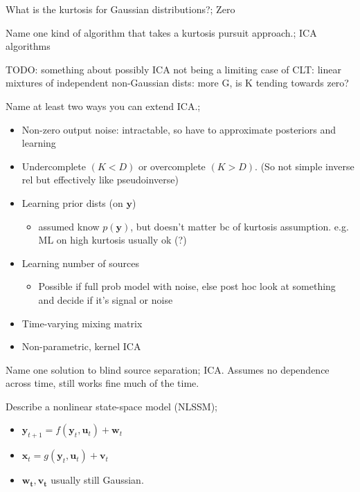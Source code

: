 \documentclass{article}
\begin{document}
What is the kurtosis for Gaussian distributions?; Zero

Name one kind of algorithm that takes a kurtosis pursuit approach.; ICA algorithms

TODO: something about possibly ICA not being a limiting case of CLT: linear mixtures of independent non-Gaussian dists: more G, is K tending towards zero?

Name at least two ways you can extend ICA.; \begin{itemize} \item Non-zero output noise: intractable, so have to approximate posteriors and learning \item Undercomplete $(K<D)$ or overcomplete $(K>D)$. (So not simple inverse rel but effectively like pseudoinverse) \item Learning prior dists (on $\mathbf{y}$) \begin{itemize} \item assumed know $p(\mathbf{y})$, but doesn't matter bc of kurtosis assumption. e.g. ML on high kurtosis usually ok (?) \end{itemize} \item Learning number of sources \begin{itemize} \item Possible if full prob model with noise, else post hoc look at something and decide if it's signal or noise \end{itemize} \item Time-varying mixing matrix \item Non-parametric, kernel ICA \end{itemize}

Name one solution to blind source separation; ICA. Assumes no dependence across time, still works fine much of the time.

Describe a nonlinear state-space model (NLSSM); \begin{itemize} \item $\mathbf{y}_{t+1}=f(\mathbf{y}_t, \mathbf{u}_t)+\mathbf{w}_t$ \item $\mathbf{x}_t=g(\mathbf{y}_t, \mathbf{u}_t)+\mathbf{v}_t$ \item $\mathbf{w_t, v_t}$ usually still Gaussian. \end{itemize}
\end{document}
